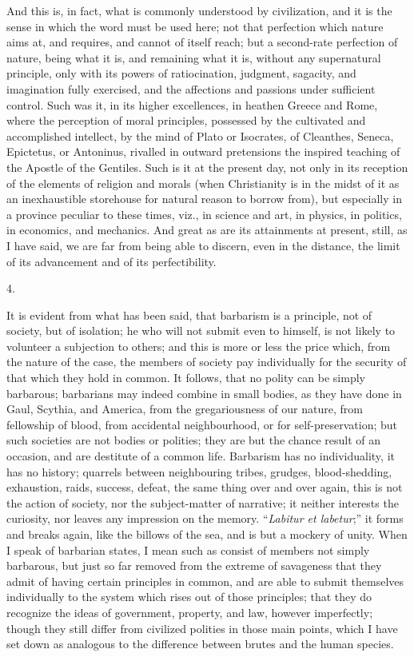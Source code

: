 And this is, in fact, what is
commonly understood by civilization, and it is the sense in which the
word must be used here; not that perfection which nature aims at, and
requires, and cannot of itself reach; but a second-rate perfection of
nature, being what it is, and remaining what it is, without any
supernatural principle, only with its powers of ratiocination,
judgment, sagacity, and imagination fully exercised, and the
affections and passions under sufficient control. Such was it, in its
higher excellences, in heathen Greece and Rome, where the perception
of moral principles, possessed by the cultivated and accomplished
intellect, by the mind of Plato or Isocrates, of Cleanthes, Seneca,
Epictetus, or Antoninus, rivalled in outward pretensions the inspired
teaching of the Apostle of the Gentiles. Such is it at the present
day, not only in its reception of the elements of religion and morals
(when Christianity is in the midst of it as an inexhaustible
storehouse for natural reason to borrow from), but especially in a
province peculiar to these times, viz., in science and art, in
physics, in politics, in economics, and mechanics. And great as are
its attainments at present, still, as I have said, we are far from
being able to discern, even in the distance, the limit of its
advancement and of its perfectibility.

4.

It is evident from what has
been said, that barbarism is a principle, not of society, but of
isolation; he who will not submit even to himself, is not likely to
volunteer a subjection to others; and this is more or less the price
which, from the nature of the case, the members of society pay
individually for the security of that which they hold in common. It
follows, that no polity can be simply barbarous; barbarians may indeed
combine in small bodies, as they have done in Gaul, Scythia, and
America, from the gregariousness of our nature, from fellowship of
blood, from accidental neighbourhood, or for self-preservation; but
such societies are not bodies or polities; they are but the chance
result of an occasion, and are destitute of a common life. Barbarism
has no individuality, it has no history; quarrels between neighbouring
tribes, grudges, blood-shedding, exhaustion, raids, success, defeat,
the same thing over and over again, this is not the action of society,
nor the subject-matter of narrative; it neither interests the
curiosity, nor leaves any impression on the memory. ``\emph{Labitur et
labetur};'' it forms and breaks again, like the billows of the sea,
and is but a mockery of unity. When I speak of barbarian states, I
mean such as consist of members not simply barbarous, but just so far
removed from the extreme of savageness that they admit of having
certain principles in common, and are able to submit themselves
individually to the system which rises out of those principles; that
they do recognize the ideas of government, property, and law, however
imperfectly; though they still differ from civilized polities in those
main points, which I have set down as analogous to the difference
between brutes and the human species.

